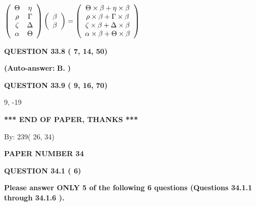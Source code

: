 \documentclass[12pt]{article}
\begin{document}
$  %
 \left( \begin{array}
 {
 c
 c
 }
 \Theta & 
 \eta \\ 
 \rho & 
 \Gamma \\ 
                    \zeta & 
 \Delta \\ 
 \alpha & 
 \Theta
 \end{array} \right)
 \left( \begin{array}
 {
 c
 }
 \beta \\ 
 \beta
 \end{array} \right)
=
  \left( \begin{array}
 {
 c
 }
 \Theta \times  \beta   +  \eta \times  \beta \\ 
 \rho \times  \beta   +  \Gamma \times  \beta \\ 
                    \zeta \times  \beta   +  \Delta \times  \beta \\ 
 \alpha \times  \beta   +  \Theta \times  \beta
 \end{array} \right)
$
 
  
  
{\textbf{\large{QUESTION
33.8 
 (          7,         14,         50)
}}}
 
 
{\textbf{(Auto-answer:}}
{\textbf{\large{
B.}}}
{\textbf{)}}
 
 
  
  
{\textbf{\large{QUESTION
33.9 
 (          9,         16,         70)
}}}

9,  %
-19
 
   
   
   
   
\vspace{1.0in} 
{\textbf{\large{ *** END OF PAPER, THANKS *** }}} 
   
   
\hspace{1.0in} By: 
         239(         26,          34)
   
   
   
   
\newpage 
\setcounter{page}{ 
    34001 } 
   
   
 {\textbf{ \Large{ PAPER NUMBER          34 }}}
   
   
   
   
  
\vspace{0.2in}
  
{\textbf{\Large{QUESTION
34.1 
 (          6)
}}}
  
  
{\textbf{\Large{Please answer ONLY  %
           5 %
 of the following  %
           6 %
 questions (Questions  %
34.1.1 %
 through  %
34.1.6 %
 ). }}}
   
\end{document}
